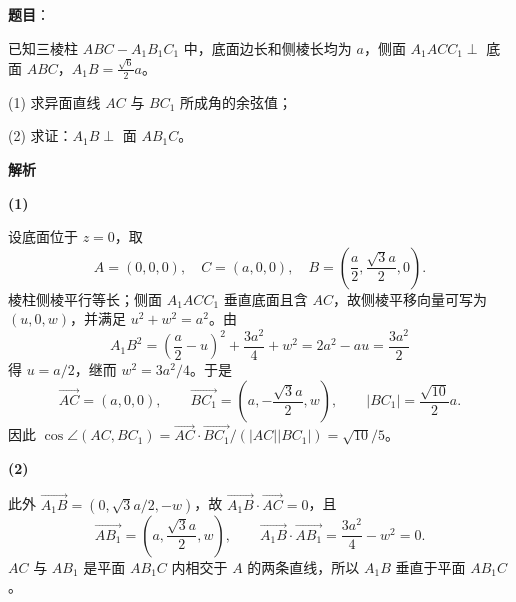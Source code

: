 \begin{answer}

\textbf{题目}：

已知三棱柱 $ABC-A_1B_1C_1$ 中，底面边长和侧棱长均为 $a$，侧面 $A_1ACC_1\perp$ 底面 $ABC$，$A_1B=\frac{\sqrt{6}}{2}a$。

(1) 求异面直线 $AC$ 与 $BC_1$ 所成角的余弦值；

(2) 求证：$A_1B\perp$ 面 $AB_1C$。
\nopagebreak[4]
\begin{center}\end{center}
\nopagebreak[4]
\textbf{解析}

\textbf{(1)}

设底面位于 $z=0$，取
\nopagebreak[4]
\[
A=(0,0,0),\quad C=(a,0,0),\quad B=\left(\frac a2,\frac{\sqrt3a}2,0\right).
\]
棱柱侧棱平行等长；侧面 $A_1ACC_1$ 垂直底面且含 $AC$，故侧棱平移向量可写为 $(u,0,w)$，并满足 $u^2+w^2=a^2$。由
\nopagebreak[4]
\[
A_1B^2=\left(\frac a2-u\right)^2+\frac{3a^2}4+w^2=2a^2-au=\frac{3a^2}2
\]
得 $u=a/2$，继而 $w^2=3a^2/4$。于是
\nopagebreak[4]
\[
\overrightarrow{AC}=(a,0,0),\qquad
\overrightarrow{BC_1}=\left(a,-\frac{\sqrt3a}2,w\right),\qquad
|BC_1|=\frac{\sqrt{10}}2a.
\]
因此 $\cos\angle(AC,BC_1)=\overrightarrow{AC}\cdot\overrightarrow{BC_1}/(|AC||BC_1|)=\sqrt{10}/5$。

\textbf{(2)}

此外 $\overrightarrow{A_1B}=(0,\sqrt3a/2,-w)$，故 $\overrightarrow{A_1B}\cdot\overrightarrow{AC}=0$，且
\nopagebreak[4]
\[
\overrightarrow{AB_1}=\left(a,\frac{\sqrt3a}2,w\right),\qquad
\overrightarrow{A_1B}\cdot\overrightarrow{AB_1}=\frac{3a^2}4-w^2=0.
\]
$AC$ 与 $AB_1$ 是平面 $AB_1C$ 内相交于 $A$ 的两条直线，所以 $A_1B$ 垂直于平面 $AB_1C$。



\end{answer}
